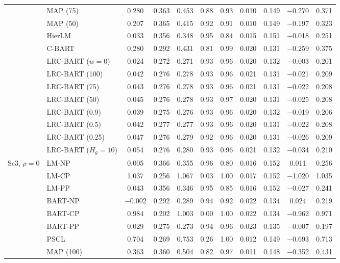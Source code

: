 \begin{center}
\begin{longtable}{llccccccccc}
& MAP (75) & 0.280 & 0.363 & 0.453 & 0.88 & 0.93 & 0.010 & 0.149 & $-$0.270 & 0.371 \\
& MAP (50) & 0.207 & 0.365 & 0.415 & 0.92 & 0.91 & 0.010 & 0.149 & $-$0.197 & 0.323 \\
& HierLM & 0.033 & 0.356 & 0.348 & 0.95 & 0.84 & 0.015 & 0.151 & $-$0.018 & 0.251 \\
& C-BART & 0.280 & 0.292 & 0.431 & 0.81 & 0.99 & 0.020 & 0.131 & $-$0.259 & 0.375 \\
& LRC-BART ($w=0$) & 0.024 & 0.272 & 0.271 & 0.93 & 0.96 & 0.020 & 0.132 & $-$0.003 & 0.201 \\
& LRC-BART (100) & 0.042 & 0.276 & 0.278 & 0.93 & 0.96 & 0.021 & 0.131 & $-$0.021 & 0.209 \\
& LRC-BART (75) & 0.043 & 0.276 & 0.278 & 0.93 & 0.96 & 0.021 & 0.131 & $-$0.022 & 0.208 \\
& LRC-BART (50) & 0.045 & 0.276 & 0.278 & 0.93 & 0.97 & 0.020 & 0.131 & $-$0.025 & 0.208 \\
& LRC-BART (0.9) & 0.039 & 0.275 & 0.276 & 0.93 & 0.96 & 0.020 & 0.132 & $-$0.019 & 0.206 \\
& LRC-BART (0.5) & 0.042 & 0.277 & 0.277 & 0.93 & 0.96 & 0.020 & 0.131 & $-$0.022 & 0.208 \\
& LRC-BART (0.25) & 0.047 & 0.276 & 0.279 & 0.92 & 0.96 & 0.020 & 0.131 & $-$0.026 & 0.209 \\
& LRC-BART ($H_g=10$) & 0.054 & 0.276 & 0.280 & 0.93 & 0.96 & 0.021 & 0.132 & $-$0.034 & 0.210 \\
\midrule
\multirow{20}{*}{Sc3, $\rho=0$} & LM-NP & 0.005 & 0.366 & 0.355 & 0.96 & 0.80 & 0.016 & 0.152 & 0.011 & 0.256 \\
& LM-CP & 1.037 & 0.256 & 1.067 & 0.03 & 1.00 & 0.017 & 0.152 & $-$1.020 & 1.035 \\
& LM-PP & 0.043 & 0.356 & 0.346 & 0.95 & 0.85 & 0.016 & 0.152 & $-$0.027 & 0.241 \\
& BART-NP & $-$0.002 & 0.292 & 0.289 & 0.94 & 0.92 & 0.022 & 0.134 & 0.024 & 0.219 \\
& BART-CP & 0.984 & 0.202 & 1.003 & 0.00 & 1.00 & 0.022 & 0.134 & $-$0.962 & 0.971 \\
& BART-PP & 0.029 & 0.275 & 0.273 & 0.94 & 0.96 & 0.023 & 0.135 & $-$0.007 & 0.197 \\
& PSCL & 0.704 & 0.269 & 0.753 & 0.26 & 1.00 & 0.012 & 0.149 & $-$0.693 & 0.713 \\
& MAP (100) & 0.363 & 0.360 & 0.504 & 0.82 & 0.97 & 0.011 & 0.148 & $-$0.352 & 0.431 \\

\end{longtable}
\end{center}
